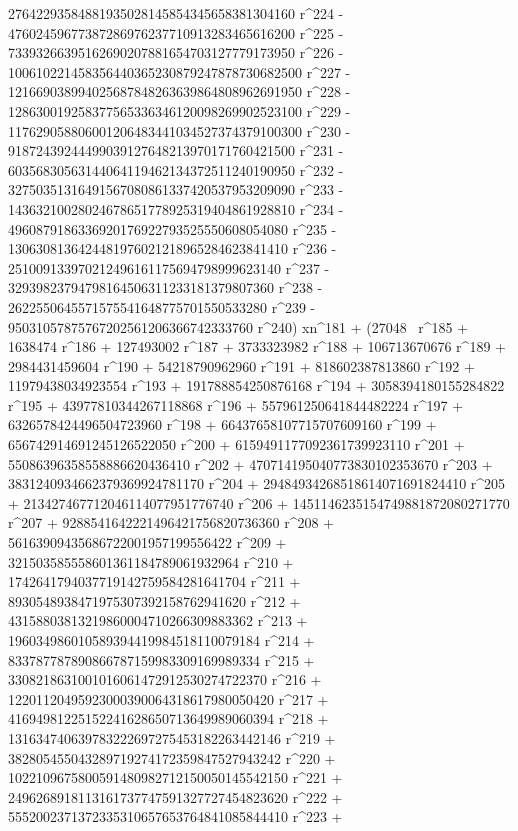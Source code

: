        27642293584881935028145854345658381304160 r^224 - 
       47602459677387286976237710913283465616200 r^225 - 
       73393266395162690207881654703127779173950 r^226 - 
       100610221458356440365230879247878730682500 r^227 - 
       121669038994025687848263639864808962691950 r^228 - 
       128630019258377565336346120098269902523100 r^229 - 
       117629058806001206483441034527374379100300 r^230 - 
       91872439244499039127648213970171760421500 r^231 - 
       60356830563144064119462134372511240190950 r^232 - 
       32750351316491567080861337420537953209090 r^233 - 
       14363210028024678651778925319404861928810 r^234 - 
       4960879186336920176922793525550608054080 r^235 - 
       1306308136424481976021218965284623841410 r^236 - 
       251009133970212496161175694798999623140 r^237 - 
       32939823794798164506311233181379807360 r^238 - 
       2622550645571575541648775701550533280 r^239 - 
       95031057875767202561206366742333760 r^240) xn^181 + (27048 \
r^185 + 1638474 r^186 + 127493002 r^187 + 3733323982 r^188 + 
       106713670676 r^189 + 2984431459604 r^190 + 
       54218790962960 r^191 + 818602387813860 r^192 + 
       11979438034923554 r^193 + 191788854250876168 r^194 + 
       3058394180155284822 r^195 + 43977810344267118868 r^196 + 
       557961250641844482224 r^197 + 6326578424496504723960 r^198 + 
       66437658107715707609160 r^199 + 
       656742914691245126522050 r^200 + 
       6159491177092361739923110 r^201 + 
       55086396358558886620436410 r^202 + 
       470714195040773830102353670 r^203 + 
       3831240934662379369924781170 r^204 + 
       29484934268518614071691824410 r^205 + 
       213427467712046114077951776740 r^206 + 
       1451146235154749881872080271770 r^207 + 
       9288541642221496421756820736360 r^208 + 
       56163909435686722001957199556422 r^209 + 
       321503585558601361184789061932964 r^210 + 
       1742641794037719142759584281641704 r^211 + 
       8930548938471975307392158762941620 r^212 + 
       43158803813219860004710266309883362 r^213 + 
       196034986010589394419984518110079184 r^214 + 
       833787787890866787159983309169989334 r^215 + 
       3308218631001016061472912530274722370 r^216 + 
       12201120495923000390064318617980050420 r^217 + 
       41694981225152241628650713649989060394 r^218 + 
       131634740639783222697275453182263442146 r^219 + 
       382805455043289719274172359847527943242 r^220 + 
       1022109675800591480982712150050145542150 r^221 + 
       2496268918113161737747591327727454823620 r^222 + 
       5552002371372335310657653764841085844410 r^223 + 
